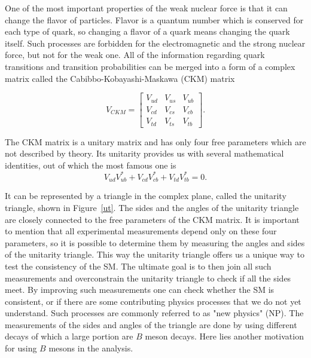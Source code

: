 \documentclass[  headings=standardclasses,
  headings=big,oneside,a4paper,openany,12pt]{scrbook}
\begin{document}
One of the most important properties of the weak nuclear force is that it can change the flavor of particles. Flavor is a quantum number which is conserved for each type of quark, so changing a flavor of a quark means changing the quark itself. Such processes are forbidden for the electromagnetic and the strong nuclear force, but not for the weak one. All of the information regarding quark transitions and transition probabilities can be merged into a form of a complex matrix called the Cabibbo-Kobayashi-Maskawa (CKM) matrix

\begin{equation}
V_{CKM} = \begin{bmatrix}
    V_{ud} & V_{us} & V_{ub}\\
	V_{cd} & V_{cs} & V_{cb}\\
	V_{td} & V_{ts} & V_{tb}
\end{bmatrix}.
\end{equation}

The CKM matrix is a unitary matrix and has only four free parameters which are not described by theory. Its unitarity provides us with several mathematical identities, out of which the most famous one is
\begin{equation}
V_{ud}V_{ub}^* + V_{cd}V_{cb}^* + V_{td}V_{tb}^* = 0.
\end{equation}

It can be represented by a triangle in the complex plane, called the unitarity triangle, shown in Figure~\ref{ut}. The sides and the angles of the unitarity triangle are closely connected to the free parameters of the CKM matrix. It is important to mention that all experimental measurements depend only on these four parameters, so it is possible to determine them by measuring the angles and sides of the unitarity triangle. This way the unitarity triangle offers us a unique way to test the consistency of the SM. The ultimate goal is to then join all such measurements and overconstrain the unitarity triangle to check if all the sides meet. By improving such measurements one can check whether the SM is consistent, or if there are some contributing physics processes that we do not yet understand. Such processes are commonly referred to as "new physics" (NP). The measurements of the sides and angles of the triangle are done by using different decays of which a large portion are $B$ meson decays. Here lies another motivation for using $B$ mesons in the analysis.
\end{document}
